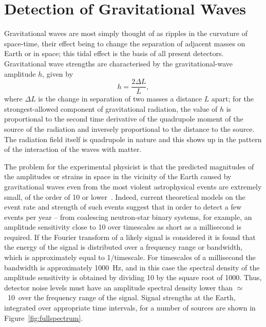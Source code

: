 \section{Detection of Gravitational Waves}
\label{section:Detection} 

Gravitational waves are most simply thought of as ripples in the curvature of
space-time, their effect being to change the separation of adjacent masses on
Earth or in space; this tidal effect is the basis of all present detectors.
Gravitational wave strengths are characterised by the gravitational-wave
amplitude $h$, given by
\begin{equation}
  h = \frac{2 \Delta L} L,
  \label{equation:h}
\end{equation}
where $\Delta L$ is the change in separation of two masses a distance $L$ apart;
for the strongest-allowed component of gravitational radiation, the value of $h$
is proportional to the second time derivative of the quadrupole moment of the
source of the radiation and inversely proportional to the distance to the
source. The radiation field itself is quadrupole in nature and this shows up in
the pattern of the interaction of the waves with matter.


The problem for the experimental physicist is that the predicted magnitudes of
the amplitudes or strains in space in the vicinity of the Earth caused by
gravitational waves even from the most violent astrophysical events are
extremely small, of the order of 10 or lower~\cite{Sathyaprakash:2009,
LISAsymposium}. Indeed, current theoretical models on the event rate and strength
of such events suggest that in order to detect a few events per year -- from
coalescing neutron-star binary systems, for example, an amplitude sensitivity
close to 10 over timescales as short as a millisecond is required. If
the Fourier transform of a likely signal is considered it is found that the
energy of the signal is distributed over a frequency range or bandwidth, which is
approximately equal to 1/timescale.  For timescales of a millisecond the
bandwidth is approximately 1000~Hz, and in this case the spectral density of the
amplitude sensitivity is obtained by dividing 10 by the square root of
1000. Thus, detector noise levels must have an amplitude spectral density lower
than $\simeq$~10~\Hz over the frequency range of the signal.
Signal strengths at the Earth, integrated over appropriate time intervals, for a
number of sources are shown in Figure~\ref{fig:fullspectrum}.

